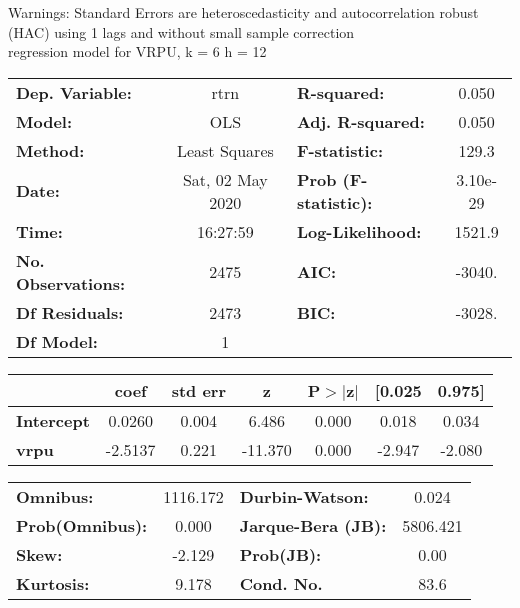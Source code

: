 Warnings: \newline
 [1] Standard Errors are heteroscedasticity and autocorrelation robust (HAC) using 1 lags and without small sample correction\\ 

regression model for VRPU, k = 6 h = 12\begin{center}
\begin{tabular}{lclc}
\toprule
\textbf{Dep. Variable:}    &       rtrn       & \textbf{  R-squared:         } &     0.050   \\
\textbf{Model:}            &       OLS        & \textbf{  Adj. R-squared:    } &     0.050   \\
\textbf{Method:}           &  Least Squares   & \textbf{  F-statistic:       } &     129.3   \\
\textbf{Date:}             & Sat, 02 May 2020 & \textbf{  Prob (F-statistic):} &  3.10e-29   \\
\textbf{Time:}             &     16:27:59     & \textbf{  Log-Likelihood:    } &    1521.9   \\
\textbf{No. Observations:} &        2475      & \textbf{  AIC:               } &    -3040.   \\
\textbf{Df Residuals:}     &        2473      & \textbf{  BIC:               } &    -3028.   \\
\textbf{Df Model:}         &           1      & \textbf{                     } &             \\
\bottomrule
\end{tabular}
\begin{tabular}{lcccccc}
                   & \textbf{coef} & \textbf{std err} & \textbf{z} & \textbf{P$> |$z$|$} & \textbf{[0.025} & \textbf{0.975]}  \\
\midrule
\textbf{Intercept} &       0.0260  &        0.004     &     6.486  &         0.000        &        0.018    &        0.034     \\
\textbf{vrpu}      &      -2.5137  &        0.221     &   -11.370  &         0.000        &       -2.947    &       -2.080     \\
\bottomrule
\end{tabular}
\begin{tabular}{lclc}
\textbf{Omnibus:}       & 1116.172 & \textbf{  Durbin-Watson:     } &    0.024  \\
\textbf{Prob(Omnibus):} &   0.000  & \textbf{  Jarque-Bera (JB):  } & 5806.421  \\
\textbf{Skew:}          &  -2.129  & \textbf{  Prob(JB):          } &     0.00  \\
\textbf{Kurtosis:}      &   9.178  & \textbf{  Cond. No.          } &     83.6  \\
\bottomrule
\end{tabular}
\end{center}

